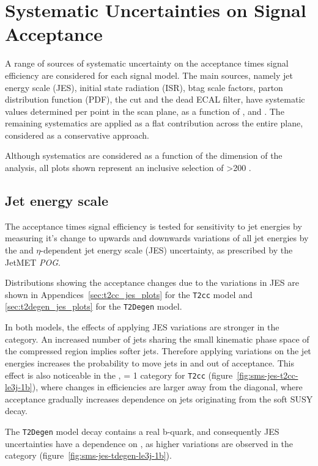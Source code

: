 \section{Systematic Uncertainties on Signal Acceptance }  %
\label{sec:interpretation_uncertainties}

A range of sources of systematic uncertainty on the acceptance times signal
efficiency are considered for each signal 
model. The main sources, namely jet energy scale (JES), initial state 
radiation (ISR), btag scale factors, parton distribution function (PDF), the 
\mhtmet cut and the dead ECAL filter, have systematic values determined per point
in the scan plane, as a function of \HT, \nb and \nj. The remaining systematics 
are applied as a flat contribution across the entire plane, considered as a 
conservative approach.

Although systematics are considered as a function of the \HT dimension of the 
analysis, all plots shown represent an inclusive selection of \HT>200 \gev.

\subsection{Jet energy scale}
The acceptance times signal efficiency is tested for sensitivity to jet energies by measuring
it's change to upwards and downwards variations of all jet energies by the 
\Pt and $\eta\text{-dependent}$ jet energy scale (JES) uncertainty, as prescribed by 
the JetMET \emph{POG}.

Distributions showing the acceptance changes due to the variations in JES are 
shown in Appendices~\ref{sec:t2cc_jes_plots} for the \texttt{T2cc} model and
\ref{sec:t2degen_jes_plots} for the \texttt{T2Degen} model.

In both models, the effects of applying 
JES variations are stronger in the \njhigh category. An increased number of jets
sharing the small kinematic phase space of the compressed region implies softer jets.
Therefore applying variations on the jet energies increases the probability to move
jets in and out of 
acceptance. This effect is also noticeable in the \njlow, \nb= 1 category for 
\texttt{T2cc} (figure~\ref{fig:sms-jes-t2cc-le3j-1b}), where changes in 
efficiencies are larger away from the diagonal, where acceptance gradually increases
dependence on jets originating from the soft SUSY decay.

The \texttt{T2Degen} model decay contains a real b-quark, and consequently JES 
uncertainties have a dependence on \nb, as higher variations are observed in 
the  category (figure~\ref{fig:sms-jes-tdegen-le3j-1b}).


